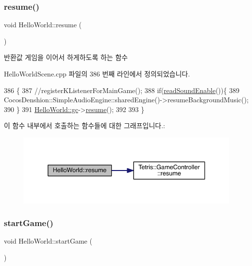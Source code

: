 \subsubsection{\texorpdfstring{resume()}{resume()}}
{\footnotesize\ttfamily void Hello\+World\+::resume (\begin{DoxyParamCaption}{ }\end{DoxyParamCaption})\hspace{0.3cm}{\ttfamily [protected]}}

\begin{DoxyReturn}{반환값}
게임을 이어서 하게하도록 하는 함수 
\end{DoxyReturn}


Hello\+World\+Scene.\+cpp 파일의 386 번째 라인에서 정의되었습니다.


\begin{DoxyCode}
386                        \{
387     \textcolor{comment}{//registerKListenerForMainGame();}
388     \textcolor{keywordflow}{if}(\hyperlink{class_hello_world_a0f8c9d1b95e03b397e680b9dafb8f3d9}{readSoundEnable}())\{
389     CocosDenshion::SimpleAudioEngine::sharedEngine()->resumeBackgroundMusic();
390     \}
391     \hyperlink{class_hello_world_a547cb213126911d9a7151f8259dc7102}{HelloWorld::gc}->\hyperlink{class_tetris_1_1_game_controller_ab9ff093ea91e3d248a8a287289e758b0}{resume}();
392     
393 \}
\end{DoxyCode}
이 함수 내부에서 호출하는 함수들에 대한 그래프입니다.\+:
\nopagebreak
\begin{figure}[H]
\begin{center}
\leavevmode
\includegraphics[width=336pt]{d9/d98/class_hello_world_ad72b45627fe36ea8cd04b9de431edc7f_cgraph}
\end{center}
\end{figure}
\mbox{\label{class_hello_world_aa4c36099096e160e3726819a2308dd04}} 
\subsubsection{\texorpdfstring{start\+Game()}{startGame()}}
{\footnotesize\ttfamily void Hello\+World\+::start\+Game (\begin{DoxyParamCaption}{ }\end{DoxyParamCaption})}



